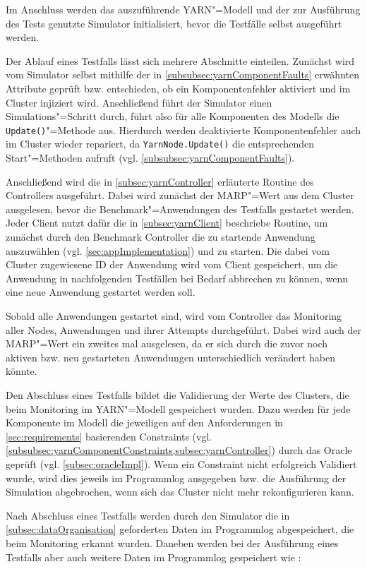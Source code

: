 Im Anschluss werden das auszuführende \ac{YARN}"=Modell und der zur Ausführung des Tests genutzte Simulator initialisiert, bevor die Testfälle selbst ausgeführt werden.

Der Ablauf eines Testfalls lässt sich mehrere Abschnitte einteilen.
Zunächst wird vom Simulator selbst mithilfe der in \cref{subsubsec:yarnComponentFaults} erwähnten Attribute geprüft bzw. entschieden, ob ein Komponentenfehler aktiviert und im Cluster injiziert wird.
Anschließend führt der Simulator einen Simulations"=Schritt durch, führt also für alle Komponenten des Modells die \texttt{Update()}"=Methode aus.
Hierdurch werden deaktivierte Komponentenfehler auch im Cluster wieder repariert, da \texttt{YarnNode.Update()} die entsprechenden Start"=Methoden aufruft (vgl. \cref{subsubsec:yarnComponentFaults}).

Anschließend wird die in \cref{subsec:yarnController} erläuterte Routine des Controllers ausgeführt.
Dabei wird zunächst der \ac{MARP}"=Wert aus dem Cluster ausgelesen, bevor die Benchmark"=Anwendungen des Testfalls gestartet werden.
Jeder Client nutzt dafür die in \cref{subsec:yarnClient} beschriebe Routine, um zunächst durch den Benchmark Controller die zu startende Anwendung auszuwählen (vgl. \cref{sec:appImplementation}) und zu starten.
Die dabei vom Cluster zugewiesene ID der Anwendung wird vom Client gespeichert, um die Anwendung in nachfolgenden Testfällen bei Bedarf abbrechen zu können, wenn eine neue Anwendung gestartet werden soll.

Sobald alle Anwendungen gestartet sind, wird vom Controller das Monitoring aller Nodes, Anwendungen und ihrer Attempts durchgeführt.
Dabei wird auch der \ac{MARP}"=Wert ein zweites mal ausgelesen, da er sich durch die zuvor noch aktiven bzw. neu gestarteten Anwendungen unterschiedlich verändert haben könnte.

Den Abschluss eines Testfalls bildet die Validierung der Werte des Clusters, die beim Monitoring im \ac{YARN}"=Modell gespeichert wurden.
Dazu werden für jede Komponente im Modell die jeweiligen auf den Anforderungen in \cref{sec:requirements} basierenden Constraints (vgl. \cref{subsubsec:yarnComponentConstraints,subsec:yarnController}) durch das Oracle geprüft (vgl. \cref{subsec:oracleImpl}).
Wenn ein Constraint nicht erfolgreich Validiert wurde, wird dies jeweils im Programmlog ausgegeben bzw. die Ausführung der Simulation abgebrochen, wenn sich das Cluster nicht mehr rekonfigurieren kann.

Nach Abschluss eines Testfalls werden durch den Simulator die in \cref{subsec:dataOrganisation} geforderten Daten im Programmlog abgespeichert, die beim Monitoring erkannt wurden.
Daneben werden bei der Ausführung eines Testfalls aber auch weitere Daten im Programmlog gespeichert wie \zB:

